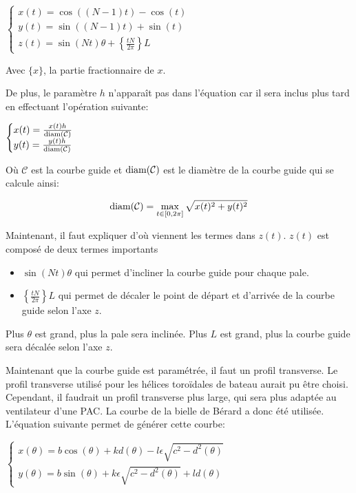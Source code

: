 \documentclass{article}
\begin{document}
$ \begin{cases}
    x(t) = \cos((N-1)t) - \cos(t) \\
    y(t) = \sin((N-1)t) + \sin(t) \\
    z(t) = \sin(Nt)\theta + \left\{ \frac{t N}{2\pi} \right\} L
\end{cases} $

Avec $\{ x \}$, la partie fractionnaire de $x$.

De plus, le paramètre $h$ n'apparaît pas dans l'équation car il sera inclus plus tard en effectuant l'opération suivante:

$ \begin{cases}
    x(t) = \frac{x(t)h}{\text{diam}(\mathcal{C})} \\
    y(t) = \frac{y(t)h}{\text{diam}(\mathcal{C})} \\
\end{cases} $

Où $\mathcal{C}$ est la courbe guide et $\text{diam}(\mathcal{C})$ est le diamètre de la courbe guide qui se calcule ainsi:

\[ \text{diam}(\mathcal{C}) = \max_{t \in [0,2\pi]} \sqrt{x(t)^2+y(t)^2} \]

\vspace{0.5cm}

Maintenant, il faut expliquer d'où viennent les termes dans $z(t)$. $z(t)$ est composé de deux termes importants

\begin{itemize}
    \item $\sin(Nt) \theta$ qui permet d'incliner la courbe guide pour chaque pale.
    \item $\left\{ \frac{t N}{2\pi} \right\} L$ qui permet de décaler le point de départ et d'arrivée de la courbe guide selon l'axe $z$.
\end{itemize}

Plus $\theta$ est grand, plus la pale sera inclinée. Plus $L$ est grand, plus la courbe guide sera décalée selon l'axe $z$.

\vspace{0.5cm}

Maintenant que la courbe guide est paramétrée, il faut un profil transverse. Le profil transverse utilisé pour les hélices toroïdales de bateau aurait pu être choisi. Cependant, il faudrait un profil transverse plus large, qui sera plus adaptée au ventilateur d'une PAC. La courbe de la bielle de Bérard a donc été utilisée. L'équation suivante permet de générer cette courbe:

$ \begin{cases}
    x(\theta) = b \cos(\theta) + kd(\theta) - l\epsilon \sqrt{c^2 - d^2(\theta)} \\
    y(\theta) = b \sin(\theta) + k \epsilon \sqrt{c^2 - d^2(\theta)} + ld(\theta)
\end{cases} $
\end{document}
